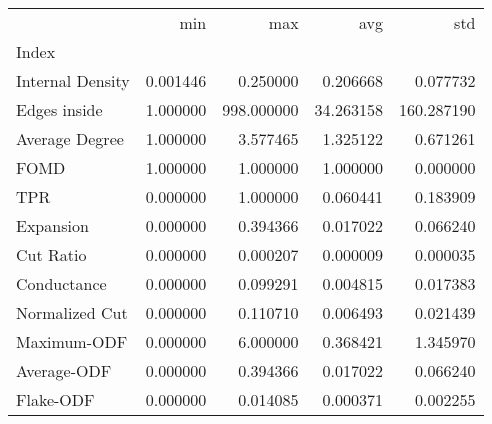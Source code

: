 \begin{tabular}{lrrrr}
\toprule
{} &       min &         max &        avg &         std \\
Index            &           &             &            &             \\
\midrule
Internal Density &  0.001446 &    0.250000 &   0.206668 &    0.077732 \\
Edges inside     &  1.000000 &  998.000000 &  34.263158 &  160.287190 \\
Average Degree   &  1.000000 &    3.577465 &   1.325122 &    0.671261 \\
FOMD             &  1.000000 &    1.000000 &   1.000000 &    0.000000 \\
TPR              &  0.000000 &    1.000000 &   0.060441 &    0.183909 \\
Expansion        &  0.000000 &    0.394366 &   0.017022 &    0.066240 \\
Cut Ratio        &  0.000000 &    0.000207 &   0.000009 &    0.000035 \\
Conductance      &  0.000000 &    0.099291 &   0.004815 &    0.017383 \\
Normalized Cut   &  0.000000 &    0.110710 &   0.006493 &    0.021439 \\
Maximum-ODF      &  0.000000 &    6.000000 &   0.368421 &    1.345970 \\
Average-ODF      &  0.000000 &    0.394366 &   0.017022 &    0.066240 \\
Flake-ODF        &  0.000000 &    0.014085 &   0.000371 &    0.002255 \\
\bottomrule
\end{tabular}
